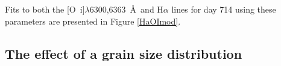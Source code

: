 Fits to both the [O~{\sc i}]$\lambda$6300,6363~\AA\ and H$\alpha$ lines for day 714 using these parameters are presented in Figure \ref{HaOImod}.


\subsection{The effect of a grain size distribution}
\label{gs_distn}

%
%
%
 
%
%
%

